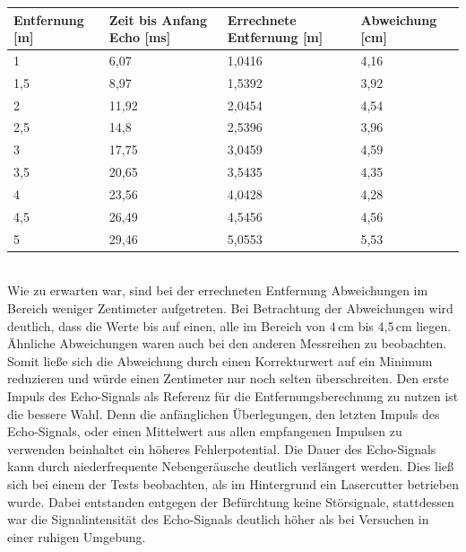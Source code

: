 \begin{minipage}{1\textwidth}
\begin{tabularx}{\textwidth}{|p{}|p{}|p{}|X|}
\hline
Entfernung [m]& Zeit bis Anfang Echo [ms]  & Errechnete Entfernung [m] & Abweichung [cm]\\
\hline
1 & 6,07 & 1,0416 & 4,16\\
\hline
1,5 & 8,97 & 1,5392 & 3,92\\
\hline
2 & 11,92 & 2,0454 & 4,54\\
\hline
2,5 & 14,8 & 2,5396 & 3,96\\
\hline
3 & 17,75 & 3,0459 & 4,59\\
\hline
3,5 & 20,65 & 3,5435 & 4,35\\
\hline
4 & 23,56 & 4,0428 & 4,28\\
\hline
4,5 & 26,49 & 4,5456 & 4,56\\
\hline
5 & 29,46 & 5,0553 & 5,53\\
\hline
\end{tabularx}

\label{tab:Entfernungsmessung}
\end{minipage}\\


Wie zu erwarten war, sind bei der errechneten Entfernung Abweichungen im Bereich weniger Zentimeter aufgetreten. Bei Betrachtung der Abweichungen wird deutlich, dass die Werte bis auf einen, alle im Bereich von 4\,cm bis 4,5\,cm liegen. Ähnliche Abweichungen waren auch bei den anderen Messreihen zu beobachten. Somit ließe sich die Abweichung durch einen Korrekturwert auf ein Minimum reduzieren und würde einen Zentimeter nur noch selten überschreiten. Den erste Impuls des Echo-Signals als Referenz für die Entfernungsberechnung zu nutzen ist die bessere Wahl. Denn die anfänglichen Überlegungen, den letzten Impuls des Echo-Signals, oder einen Mittelwert aus allen empfangenen Impulsen zu verwenden beinhaltet ein höheres Fehlerpotential. Die Dauer des Echo-Signals kann durch niederfrequente Nebengeräusche deutlich verlängert werden. Dies ließ sich bei einem der Tests beobachten, als im Hintergrund ein Lasercutter betrieben wurde. Dabei entstanden entgegen der Befürchtung keine Störsignale, stattdessen war die Signalintensität des Echo-Signals deutlich höher als bei Versuchen in einer ruhigen Umgebung. 












